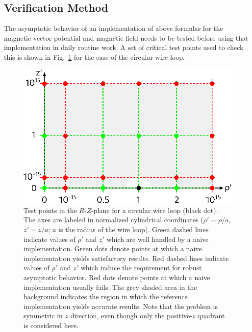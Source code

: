 \subsection{Verification Method}
The asymptotic behavior of an implementation of above formulas for the magnetic vector potential
and magnetic field needs to be tested before using that implementation in daily routine work.
A set of critical test points used to check this is shown in Fig.~\ref{fig:circularLoop_criticalPoints}
for the case of the circular wire loop.
\begin{figure}[htbp]
 \centering
 \includegraphics{img/circularLoop_criticalPoints.eps}
 \caption{Test points in the $R$-$Z$-plane for a circular wire loop (black dot).
          The axes are labeled in normalized cylindrical coordinates ($\rho' = \rho / a$, $z' = z / a$; $a$ is the radius of the wire loop).
          Green dashed lines indicate values of $\rho'$ and $z'$ which are well handled by a naive implementation.
          Green dots denote points at which a naive implementation yields satisfactory results.
          Red dashed lines indicate values of $\rho'$ and $z'$ which induce the requirement for robust asymptotic behavior.
          Red dots denote points at which a naive implementation usually fails.
          The grey shaded area in the background indicates the region in which the reference implementation yields accurate results.
          Note that the problem is symmetric in $z$ direction, even though only the positive-$z$ quadrant is considered here.}
 \label{fig:circularLoop_criticalPoints}
\end{figure}
